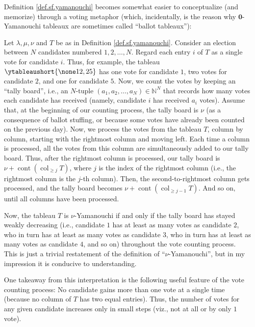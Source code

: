 \begin{remark}
\label{rmk.sf.yamanouchi.votes}Definition \ref{def.sf.yamanouchi} becomes
somewhat easier to conceptualize (and memorize) through a voting metaphor
(which, incidentally, is the reason why $\mathbf{0}$-Yamanouchi tableaux are
sometimes called \textquotedblleft ballot tableaux\textquotedblright):

Let $\lambda,\mu,\nu$ and $T$ be as in Definition \ref{def.sf.yamanouchi}.
Consider an election between $N$ candidates numbered $1,2,\ldots,N$. Regard
each entry $i$ of $T$ as a single vote for candidate $i$. Thus, for example,
the tableau $\ytableaushort{\none 12,25}$ has one vote for candidate $1$, two
votes for candidate $2$, and one for candidate $5$. Now, we count the votes by
keeping an \textquotedblleft tally board\textquotedblright, i.e., an $N$-tuple
$\left(  a_{1},a_{2},\ldots,a_{N}\right)  \in\mathbb{N}^{N}$ that records how
many votes each candidate has received (namely, candidate $i$ has received
$a_{i}$ votes). Assume that, at the beginning of our counting process, the
tally board is $\nu$ (as a consequence of ballot stuffing, or because some
votes have already been counted on the previous day). Now, we process the
votes from the tableau $T$, column by column, starting with the rightmost
column and moving left. Each time a column is processed, all the votes from
this column are simultaneously added to our tally board. Thus, after the
rightmost column is processed, our tally board is $\nu+\operatorname*{cont}%
\left(  \operatorname{col}_{\geq j}T\right)  $, where $j$ is the index of the
rightmost column (i.e., the rightmost column is the $j$-th column). Then, the
second-to-rightmost column gets processed, and the tally board becomes
$\nu+\operatorname*{cont}\left(  \operatorname{col}_{\geq j-1}T\right)  $. And
so on, until all columns have been processed.

Now, the tableau $T$ is $\nu$-Yamanouchi if and only if the tally board has
stayed weakly decreasing (i.e., candidate $1$ has at least as many votes as
candidate $2$, who in turn has at least as many votes as candidate $3$, who in
turn has at least as many votes as candidate $4$, and so on) throughout the
vote counting process. This is just a trivial restatement of the definition of
\textquotedblleft$\nu$-Yamanouchi\textquotedblright, but in my impression it
is conducive to understanding.

One takeaway from this interpretation is the following useful feature of the
vote counting process: No candidate gains more than one vote at a single time
(because no column of $T$ has two equal entries). Thus, the number of votes
for any given candidate increases only in small steps (viz., not at all or by
only $1$ vote).
\end{remark}

